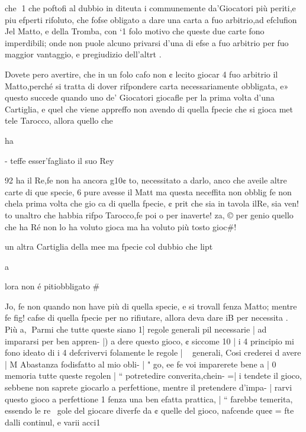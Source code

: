 \documentclass[12pt,a6paper]{article}
\begin{document}
che
1
che poftofi al dubbio in diteuta
i communemente da’Giocatori più periti,e piu efperti rifoluto, che fofse obligato a dare una
carta a fuo arbitrio,ad efclufion
Jel Matto, e della Tromba, con
‘1 folo motivo che queste due
carte fono imperdibili; onde
non puole alcuno privarsi d’una
di efse a fuo arbitrio per fuo
maggior vantaggio, e pregiudizio dell’altrt .

Dovete pero avertire, che in
un folo cafo non ¢ lecito giocar
4 fuo arbitrio il Matto,perché si
tratta di dover rifpondere carta
necessariamente obbligata, e»
questo succede quando uno de’
Giocatori giocafle per la prima
volta d’una Cartiglia, e quel
che viene appreffo non avendo
di quella fpecie che si gioca met
tele Tarocco, allora quello che

ha
 

 

 

 

 

 

 

- teffe esser’fagliato il suo Rey

92
ha il Re,fe non ha ancora g10¢
to, necessitato a darlo, anco
che aveile altre carte di que
specie, 6 pure avesse il Matt
ma questa neceffita non obblig
fe non chela prima volta che
gio ca di quella fpecie, ¢ prit
che sia in tavola ilRe, sia ven!
to unaltro che habbia rifpo
Tarocco,fe poi o per inaverte!
za, © per genio quello che ha
Ré non lo ha voluto gioca
ma ha voluto più tosto gioc#!

un altra Cartiglia della mee
ma fpecie col dubbio che lipt

a

lora non é pitiobbligato #

Jo, fe non quando non have
più di quella specie, e si trovall
fenza Matto; mentre fe fig!
cafse di quella fpecie per no
rifiutare, allora deva dare iB
per necessita . Più
a,
Parmi che tutte queste siano 1]
regole generali pil necessarie |
ad impararsi per ben appren- |)
a dere questo gioco, ¢ siccome 10 |
i 4 principio mi fono ideato di i
4 defcrivervi folamente le regole |
~ generali, Cosi crederei d avere |
M Abastanza fodisfatto al mio obli- |
" go, ee fe voi imparerete bene a |
0 memoria tutte queste regolen |
“ potretedire converita,chein- =|
i tendete il gioco, sebbene non
 saprete giocarlo a perfettione,
mentre il pretendere d’impa- |
rarvi questo gioco a perfettione 1
fenza una ben efatta prattica, |
“  farebbe temerita, essendo le re~ gole del giocare diverfe da
¢ quelle del gioco, nafcende que¢ = fte dalli continul, e varii acci1
\end{document}
